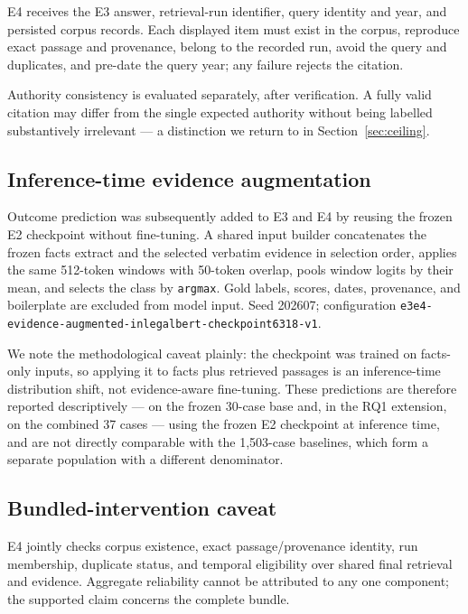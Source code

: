 \documentclass[conference]{IEEEtran}
\begin{document}
E4 receives the E3 answer, retrieval-run identifier, query identity and
year, and persisted corpus records. Each displayed item must exist in the
corpus, reproduce exact passage and provenance, belong to the recorded
run, avoid the query and duplicates, and pre-date the
query year; any failure rejects the citation.

Authority consistency is evaluated separately, after verification. A fully valid
citation may differ from the single expected authority without being labelled
substantively irrelevant --- a distinction we return to in
Section~\ref{sec:ceiling}.

\subsection{Inference-time evidence augmentation}

Outcome prediction was subsequently added to E3 and E4 by reusing the frozen E2
checkpoint without fine-tuning. A shared input builder concatenates the frozen
facts extract and the selected verbatim evidence in selection order, applies the
same 512-token windows with 50-token overlap, pools window logits by their mean,
and selects the class by \texttt{argmax}. Gold labels, scores, dates,
provenance, and boilerplate
are excluded from model input. Seed 202607; configuration
\texttt{e3e4-\allowbreak evidence-\allowbreak augmented-\allowbreak inlegalbert-\allowbreak checkpoint6318-\allowbreak v1}.

We note the methodological caveat plainly: the checkpoint was trained on
facts-only inputs, so applying it to facts plus retrieved passages is an
inference-time distribution shift, not evidence-aware fine-tuning. These
predictions are therefore reported descriptively --- on the frozen 30-case
base and, in the RQ1 extension, on the combined 37 cases --- using the frozen E2
checkpoint at inference time, and are
not directly comparable with the 1{,}503-case baselines, which form a
separate population with a different denominator.

\subsection{Bundled-intervention caveat}

E4 jointly checks corpus existence,
exact passage/provenance identity, run membership, duplicate
status, and temporal eligibility over shared final retrieval
and evidence. Aggregate reliability cannot be attributed to any one
component; the supported claim concerns the complete bundle.
\end{document}
